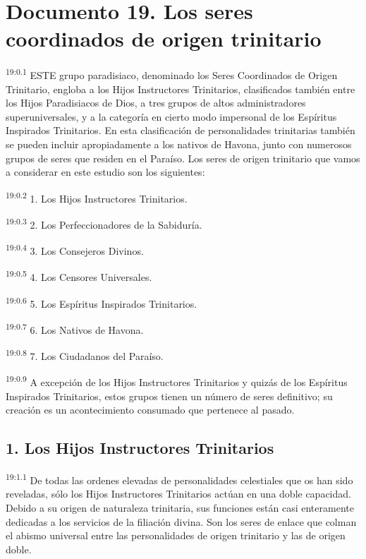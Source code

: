 \chapter{Documento 19. Los seres coordinados de origen trinitario}
\par
\textsuperscript{19:0.1} ESTE grupo paradisiaco, denominado los Seres Coordinados de Origen Trinitario, engloba a los Hijos Instructores Trinitarios, clasificados también entre los Hijos Paradisiacos de Dios, a tres grupos de altos administradores superuniversales, y a la categoría en cierto modo impersonal de los Espíritus Inspirados Trinitarios. En esta clasificación de personalidades trinitarias también se pueden incluir apropiadamente a los nativos de Havona, junto con numerosos grupos de seres que residen en el Paraíso. Los seres de origen trinitario que vamos a considerar en este estudio son los siguientes:

\par
\textsuperscript{19:0.2} 1. Los Hijos Instructores Trinitarios.

\par
\textsuperscript{19:0.3} 2. Los Perfeccionadores de la Sabiduría.

\par
\textsuperscript{19:0.4} 3. Los Consejeros Divinos.

\par
\textsuperscript{19:0.5} 4. Los Censores Universales.

\par
\textsuperscript{19:0.6} 5. Los Espíritus Inspirados Trinitarios.

\par
\textsuperscript{19:0.7} 6. Los Nativos de Havona.

\par
\textsuperscript{19:0.8} 7. Los Ciudadanos del Paraíso.

\par
\textsuperscript{19:0.9} A excepción de los Hijos Instructores Trinitarios y quizás de los Espíritus Inspirados Trinitarios, estos grupos tienen un número de seres definitivo; su creación es un acontecimiento consumado que pertenece al pasado.

\section*{1. Los Hijos Instructores Trinitarios}
\par
\textsuperscript{19:1.1} De todas las ordenes elevadas de personalidades celestiales que os han sido reveladas, sólo los Hijos Instructores Trinitarios actúan en una doble capacidad. Debido a su origen de naturaleza trinitaria, sus funciones están casi enteramente dedicadas a los servicios de la filiación divina. Son los seres de enlace que colman el abismo universal entre las personalidades de origen trinitario y las de origen doble.

